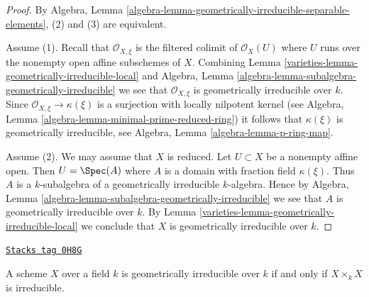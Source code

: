 \begin{proof}

By Algebra,
Lemma \ref{algebra-lemma-geometrically-irreducible-separable-elements},
(2) and (3) are equivalent.

\medskip\noindent
Assume (1). Recall that $\mathcal{O}_{X, \xi}$ is the filtered
colimit of $\mathcal{O}_X(U)$ where $U$ runs over the nonempty
open affine subschemes of $X$. Combining
Lemma \ref{varieties-lemma-geometrically-irreducible-local}
and
Algebra, Lemma \ref{algebra-lemma-subalgebra-geometrically-irreducible}
we see that $\mathcal{O}_{X, \xi}$ is geometrically irreducible over $k$.
Since $\mathcal{O}_{X, \xi} \to \kappa(\xi)$ is a surjection with
locally nilpotent kernel (see
Algebra, Lemma \ref{algebra-lemma-minimal-prime-reduced-ring})
it follows that $\kappa(\xi)$ is geometrically irreducible, see
Algebra, Lemma \ref{algebra-lemma-p-ring-map}.

\medskip\noindent
Assume (2). We may assume that $X$ is reduced. Let $U \subset X$ be
a nonempty affine open. Then $U = \Spec(A)$ where $A$ is a domain
with fraction field $\kappa(\xi)$. Thus $A$ is a $k$-subalgebra
of a geometrically irreducible $k$-algebra. Hence by
Algebra, Lemma \ref{algebra-lemma-subalgebra-geometrically-irreducible}
we see that $A$ is geometrically irreducible over $k$.
By Lemma \ref{varieties-lemma-geometrically-irreducible-local} we conclude
that $X$ is geometrically irreducible over $k$.
\end{proof}

\begin{lemma}
\label{varieties-lemma-geometrically-irreducible-self-product}
\href{https://stacks.math.columbia.edu/tag/0H8G}{\texttt{Stacks tag 0H8G}}

A scheme $X$ over a field $k$ is geometrically irreducible
over $k$ if and only if $X\times_k X$ is irreducible.
\end{lemma}

